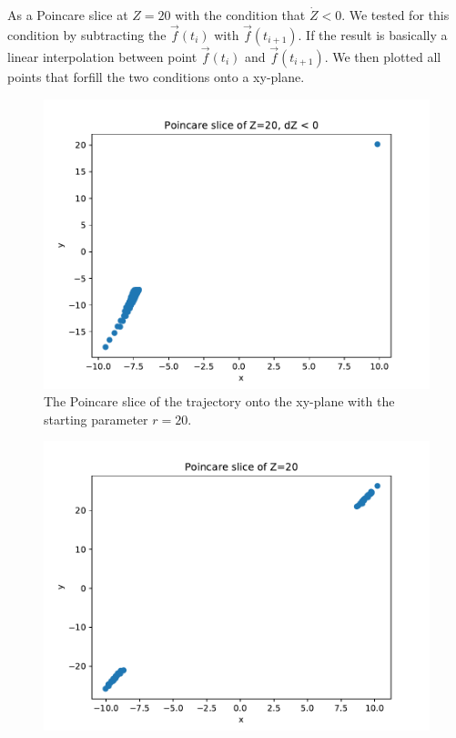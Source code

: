 \begin{itemize}
\begin{itemize}
                    As a Poincare slice at $Z=20$ with the condition that $\dot{Z} < 0$.
                    We tested for this condition by subtracting the $\vec{f}(t_i)$ with $\vec{f}(t_{i+1})$. 
                    If the result is basically a linear interpolation between point $\vec{f}(t_i)$ and $\vec{f}(t_{i+1})$.
                    We then plotted all points that forfill the two conditions onto a xy-plane.
                    \FloatBarrier
                    \begin{figure}
                        \includegraphics[width=\textwidth]{images/Lorentz_r_20_slice.pdf}
                        \caption{The Poincare slice of the trajectory onto the xy-plane with the starting parameter $r=20$.}
                    \end{figure}
                    \begin{figure}
                        \includegraphics[width=\textwidth]{images/Lorentz_r_28_slice.pdf}

\end{figure}
\end{itemize}
\end{itemize}
